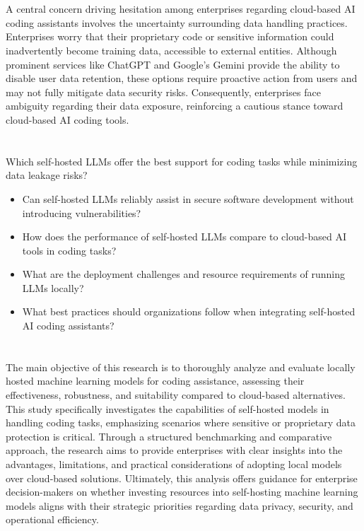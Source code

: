 \section{}%
\label{sec:probleemstelling}

A central concern driving hesitation among enterprises regarding cloud-based AI coding assistants involves the uncertainty surrounding data handling practices. Enterprises worry that their proprietary code or sensitive information could inadvertently become training data, accessible to external entities. Although prominent services like ChatGPT and Google's Gemini provide the ability to disable user data retention, these options require proactive action from users and may not fully mitigate data security risks. Consequently, enterprises face ambiguity regarding their data exposure, reinforcing a cautious stance toward cloud-based AI coding tools.

\section{}%
\label{sec:onderzoeksvraag}

Which self-hosted LLMs offer the best support for coding tasks while minimizing data leakage risks?

\begin{itemize}
  \item Can self-hosted LLMs reliably assist in secure software development without introducing vulnerabilities?
  \item How does the performance of self-hosted LLMs compare to cloud-based AI tools in coding tasks?
  \item What are the deployment challenges and resource requirements of running LLMs locally?
  \item What best practices should organizations follow when integrating self-hosted AI coding assistants?
\end{itemize}

\section{}%
\label{sec:onderzoeksdoelstelling}

The main objective of this research is to thoroughly analyze and evaluate locally hosted machine learning models for coding assistance, assessing their effectiveness, robustness, and suitability compared to cloud-based alternatives. This study specifically investigates the capabilities of self-hosted models in handling coding tasks, emphasizing scenarios where sensitive or proprietary data protection is critical. Through a structured benchmarking and comparative approach, the research aims to provide enterprises with clear insights into the advantages, limitations, and practical considerations of adopting local models over cloud-based solutions. Ultimately, this analysis offers guidance for enterprise decision-makers on whether investing resources into self-hosting machine learning models aligns with their strategic priorities regarding data privacy, security, and operational efficiency.
